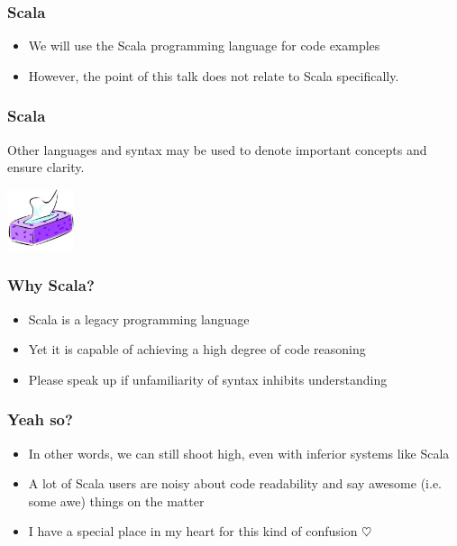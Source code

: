 \begin{frame}
\frametitle{Scala}
\begin{itemize}
  \item We will use the Scala programming language for code examples
  \item However, the point of this talk does not relate to Scala specifically.
\end{itemize}
\end{frame}

\begin{frame}
\frametitle{Scala}
\begin{center}
Other languages and syntax may be used to denote important concepts and ensure clarity.
\end{center}
\begin{center}
\includegraphics[height=1.8cm]{image/tissues.jpg}
\end{center}
\end{frame}

\begin{frame}
\frametitle{Why Scala?}
\begin{itemize}
  \item Scala is a legacy programming language
  \item Yet it is capable of achieving a high degree of code reasoning
  \item Please speak up if unfamiliarity of syntax inhibits understanding
\end{itemize}
\end{frame}

\begin{frame}
\frametitle{Yeah so?}
\begin{itemize}
  \item In other words, we can still shoot high, even with inferior systems like Scala
  \item A lot of Scala users are noisy about code readability and say awesome (i.e. some awe) things on the matter
  \item<2-> I have a special place in my heart for this kind of confusion $\heartsuit$
\end{itemize}
\end{frame}
